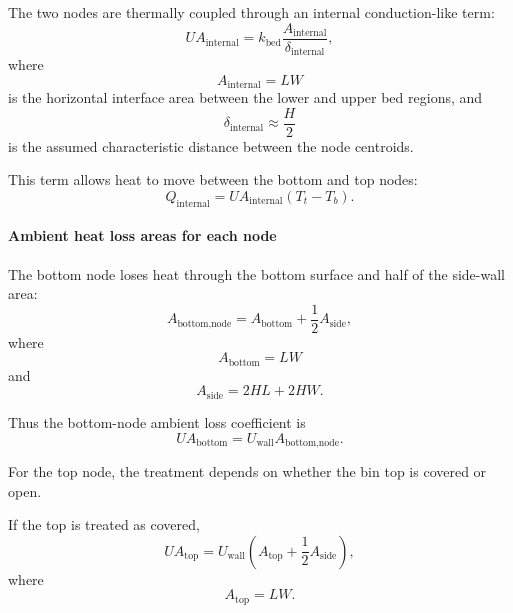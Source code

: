 \documentclass{article}
\begin{document}
The two nodes are thermally coupled through an internal conduction-like term:
\begin{equation}
UA_{\text{internal}}
=
k_{\text{bed}}
\frac{A_{\text{internal}}}{\delta_{\text{internal}}},
\end{equation}
where
\begin{equation}
A_{\text{internal}} = LW
\end{equation}
is the horizontal interface area between the lower and upper bed regions, and
\begin{equation}
\delta_{\text{internal}} \approx \frac{H}{2}
\end{equation}
is the assumed characteristic distance between the node centroids.

This term allows heat to move between the bottom and top nodes:
\begin{equation}
Q_{\text{internal}} = UA_{\text{internal}}(T_t-T_b).
\end{equation}

\paragraph{Ambient heat loss areas for each node}

The bottom node loses heat through the bottom surface and half of the
side-wall area:
\begin{equation}
A_{\text{bottom,node}} = A_{\text{bottom}} + \frac{1}{2}A_{\text{side}},
\end{equation}
where
\begin{equation}
A_{\text{bottom}} = LW
\end{equation}
and
\begin{equation}
A_{\text{side}} = 2HL + 2HW.
\end{equation}

Thus the bottom-node ambient loss coefficient is
\begin{equation}
UA_{\text{bottom}} = U_{\text{wall}} A_{\text{bottom,node}}.
\end{equation}

For the top node, the treatment depends on whether the bin top is covered or
open.

If the top is treated as covered,
\begin{equation}
UA_{\text{top}}
=
U_{\text{wall}}
\left(
A_{\text{top}}+\frac{1}{2}A_{\text{side}}
\right),
\end{equation}
where
\begin{equation}
A_{\text{top}} = LW.
\end{equation}
\end{document}
